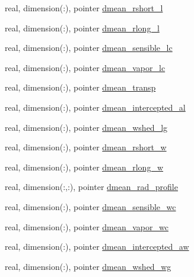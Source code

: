 \begin{DoxyCompactItemize}
\item 
real, dimension(\+:), pointer \hyperlink{structed__state__vars_1_1patchtype_aaae0d4a09b0c2f0cabb9ed53077aa038}{dmean\+\_\+rshort\+\_\+l}
\item 
real, dimension(\+:), pointer \hyperlink{structed__state__vars_1_1patchtype_a2c34274b4e10047a1940e79ca285d0f6}{dmean\+\_\+rlong\+\_\+l}
\item 
real, dimension(\+:), pointer \hyperlink{structed__state__vars_1_1patchtype_a741036bec62476e8e3cc20da69fea144}{dmean\+\_\+sensible\+\_\+lc}
\item 
real, dimension(\+:), pointer \hyperlink{structed__state__vars_1_1patchtype_aa2ce7ae4194896d00ae4784c28f13ad0}{dmean\+\_\+vapor\+\_\+lc}
\item 
real, dimension(\+:), pointer \hyperlink{structed__state__vars_1_1patchtype_a762456c07f89749a3085befaa3e2ad03}{dmean\+\_\+transp}
\item 
real, dimension(\+:), pointer \hyperlink{structed__state__vars_1_1patchtype_a63dc75ed6a9e491abcd325c10a816dfa}{dmean\+\_\+intercepted\+\_\+al}
\item 
real, dimension(\+:), pointer \hyperlink{structed__state__vars_1_1patchtype_aaa9517a9235393d22e56b6943c64b3aa}{dmean\+\_\+wshed\+\_\+lg}
\item 
real, dimension(\+:), pointer \hyperlink{structed__state__vars_1_1patchtype_a56f0d15e60a77d7e8812ae3bbc1265c9}{dmean\+\_\+rshort\+\_\+w}
\item 
real, dimension(\+:), pointer \hyperlink{structed__state__vars_1_1patchtype_a9e9e83d85741b0374632224fb8ee787e}{dmean\+\_\+rlong\+\_\+w}
\item 
real, dimension(\+:,\+:), pointer \hyperlink{structed__state__vars_1_1patchtype_a8aabb38e595edf404a57c53cf9128c8a}{dmean\+\_\+rad\+\_\+profile}
\item 
real, dimension(\+:), pointer \hyperlink{structed__state__vars_1_1patchtype_a7a68d1e63d27b1b71701320278d18124}{dmean\+\_\+sensible\+\_\+wc}
\item 
real, dimension(\+:), pointer \hyperlink{structed__state__vars_1_1patchtype_aef5e8cd844c9a09e737713eccada5221}{dmean\+\_\+vapor\+\_\+wc}
\item 
real, dimension(\+:), pointer \hyperlink{structed__state__vars_1_1patchtype_a4dccdf246d230860038877451b2e677f}{dmean\+\_\+intercepted\+\_\+aw}
\item 
real, dimension(\+:), pointer \hyperlink{structed__state__vars_1_1patchtype_a226555cbab379b79baa784949f0bd5b0}{dmean\+\_\+wshed\+\_\+wg}
\item 

\end{DoxyCompactItemize}

